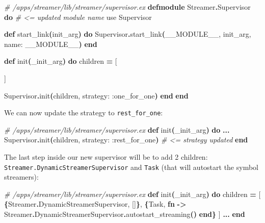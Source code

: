 \documentclass[
  oneside]{book}
\newenvironment{Shaded}{\begin{snugshade}}{\end{snugshade}}
\newcommand{\CommentTok}[1]{\textcolor[rgb]{0.56,0.35,0.01}{\textit{#1}}}
\newcommand{\ConstantTok}[1]{\textcolor[rgb]{0.56,0.35,0.01}{#1}}
\newcommand{\FunctionTok}[1]{\textcolor[rgb]{0.13,0.29,0.53}{\textbf{#1}}}
\newcommand{\ImportTok}[1]{#1}
\newcommand{\KeywordTok}[1]{\textcolor[rgb]{0.13,0.29,0.53}{\textbf{#1}}}
\newcommand{\NormalTok}[1]{#1}
\newcommand{\OperatorTok}[1]{\textcolor[rgb]{0.81,0.36,0.00}{\textbf{#1}}}
\newcommand{\OtherTok}[1]{\textcolor[rgb]{0.56,0.35,0.01}{#1}}
\newcommand{\VariableTok}[1]{\textcolor[rgb]{0.00,0.00,0.00}{#1}}
\begin{document}
\begin{Shaded}
\begin{Highlighting}[]
\CommentTok{\# /apps/streamer/lib/streamer/supervisor.ex}
\KeywordTok{defmodule} \ConstantTok{Streamer}\OperatorTok{.}\ConstantTok{Supervisor} \KeywordTok{do} \CommentTok{\# \textless{}= updated module name}
  \ImportTok{use} \ConstantTok{Supervisor}

  \KeywordTok{def}\NormalTok{ start\_link}\FunctionTok{(}\NormalTok{init\_arg}\FunctionTok{)} \KeywordTok{do}
    \ConstantTok{Supervisor}\OperatorTok{.}\NormalTok{start\_link}\FunctionTok{(}\ConstantTok{\_\_MODULE\_\_}\NormalTok{, init\_arg, }\VariableTok{name:} \ConstantTok{\_\_MODULE\_\_}\FunctionTok{)}
  \KeywordTok{end}

  \KeywordTok{def}\NormalTok{ init}\FunctionTok{(}\NormalTok{\_init\_arg}\FunctionTok{)} \KeywordTok{do}
\NormalTok{    children }\OperatorTok{=} \OtherTok{[}

    \OtherTok{]}

    \ConstantTok{Supervisor}\OperatorTok{.}\NormalTok{init}\FunctionTok{(}\NormalTok{children, }\VariableTok{strategy:} \VariableTok{:one\_for\_one}\FunctionTok{)}
  \KeywordTok{end}
\KeywordTok{end}
\end{Highlighting}
\end{Shaded}

We can now update the strategy to \texttt{rest\_for\_one}:

\begin{Shaded}
\begin{Highlighting}[]
\CommentTok{\# /apps/streamer/lib/streamer/supervisor.ex}
  \KeywordTok{def}\NormalTok{ init}\FunctionTok{(}\NormalTok{\_init\_arg}\FunctionTok{)} \KeywordTok{do}
    \OperatorTok{...}
    \ConstantTok{Supervisor}\OperatorTok{.}\NormalTok{init}\FunctionTok{(}\NormalTok{children, }\VariableTok{strategy:} \VariableTok{:rest\_for\_one}\FunctionTok{)} \CommentTok{\# \textless{}= strategy updated}
  \KeywordTok{end}
\end{Highlighting}
\end{Shaded}

The last step inside our new supervisor will be to add 2 children: \texttt{Streamer.DynamicStreamerSupervisor} and \texttt{Task} (that will autostart the symbol streamers):

\begin{Shaded}
\begin{Highlighting}[]
\CommentTok{\# /apps/streamer/lib/streamer/supervisor.ex}
  \KeywordTok{def}\NormalTok{ init}\FunctionTok{(}\NormalTok{\_init\_arg}\FunctionTok{)} \KeywordTok{do}
\NormalTok{    children }\OperatorTok{=} \OtherTok{[}
      \FunctionTok{\{}\ConstantTok{Streamer}\OperatorTok{.}\ConstantTok{DynamicStreamerSupervisor}\NormalTok{, }\OtherTok{[]}\FunctionTok{\}}\NormalTok{,}
      \FunctionTok{\{}\ConstantTok{Task}\NormalTok{,}
       \KeywordTok{fn} \OperatorTok{{-}\textgreater{}}
         \ConstantTok{Streamer}\OperatorTok{.}\ConstantTok{DynamicStreamerSupervisor}\OperatorTok{.}\NormalTok{autostart\_streaming}\FunctionTok{()}
       \KeywordTok{end}\FunctionTok{\}}
    \OtherTok{]}
    \OperatorTok{...}
  \KeywordTok{end}
\end{Highlighting}
\end{Shaded}
\end{document}
